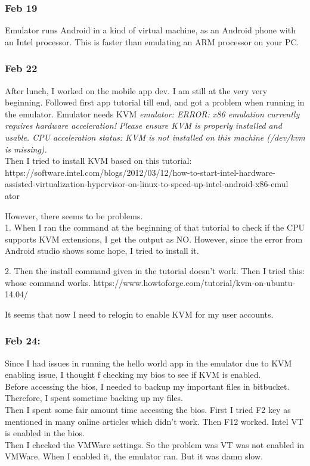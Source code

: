 \documentclass[11pt]{article}
\begin{document}
\subsubsection*{Feb 19}
Emulator runs Android in a kind of virtual machine, as an Android phone with an Intel processor. This is faster than emulating an ARM processor on 
your PC.

\subsubsection*{Feb 22}
After lunch, I worked on the mobile app dev. I am still at the very very beginning. Followed first app tutorial till end, and got a problem when 
running in the emulator. Emulator needs KVM \textit{emulator: ERROR: x86 emulation currently requires hardware acceleration!
Please ensure KVM is properly installed and usable.
CPU acceleration status: KVM is not installed on this machine (/dev/kvm is missing).} \\

Then I tried to install KVM based on this tutorial:\\
https://software.intel.com/blogs/2012/03/12/how-to-start-intel-hardware-assisted-virtualization-hypervisor-on-linux-to-speed-up-intel-android-x86-emul
ator

However, there seems to be problems. \\
1. When I ran the command at the beginning of that tutorial to check if the CPU supports KVM extensions, I get 
the output as NO. However, since the error from Android studio shows some hope, I tried to install it.

2. Then the install command given in the tutorial doesn't work. Then I tried this: whose command works. 
https://www.howtoforge.com/tutorial/kvm-on-ubuntu-14.04/

It seems that now I need to relogin to enable KVM for my user accounts. 

\subsubsection*{Feb 24:}
Since I had issues in running the hello world app in the emulator due to KVM enabling issue, I thought f checking my bios to see if KVM is enabled.\\
Before accessing the bios, I needed to backup my important files in bitbucket. Therefore, I spent sometime backing up my files.\\
Then I spent some fair amount time accessing the bios. First I tried F2 key as mentioned in many online articles which didn't work. Then F12 worked. 
Intel VT is enabled in the bios.\\
Then I checked the VMWare settings. So the problem was VT was not enabled in VMWare. When I enabled it, the emulator ran. But it was damn slow.\\
\end{document}
